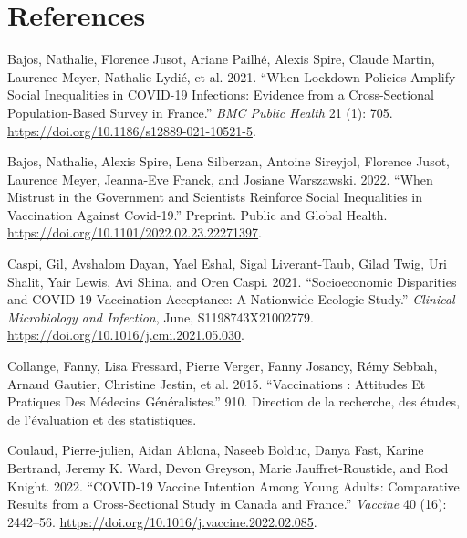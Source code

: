 \documentclass[
]{article}
\newlength{\cslhangindent}
\newlength{\cslentryspacingunit} %
\newenvironment{CSLReferences}[2] %
 {%
  \setlength{\parindent}{0pt}
  \ifodd #1
  \let\oldpar\par
  \def\par{\hangindent=\cslhangindent\oldpar}
  \fi
  \setlength{\parskip}{#2\cslentryspacingunit}
 }%
 {}
\begin{document}
\hypertarget{references}{%
\section*{References}\label{references}}

\hypertarget{refs}{}
\begin{CSLReferences}{1}{0}
\leavevmode{}%
Bajos, Nathalie, Florence Jusot, Ariane Pailhé, Alexis Spire, Claude Martin, Laurence Meyer, Nathalie Lydié, et al. 2021. {``When Lockdown Policies Amplify Social Inequalities in {COVID-19} Infections: Evidence from a Cross-Sectional Population-Based Survey in {France}.''} \emph{BMC Public Health} 21 (1): 705. \url{https://doi.org/10.1186/s12889-021-10521-5}.

\leavevmode{}%
Bajos, Nathalie, Alexis Spire, Lena Silberzan, Antoine Sireyjol, Florence Jusot, Laurence Meyer, Jeanna-Eve Franck, and Josiane Warszawski. 2022. {``When Mistrust in the Government and Scientists Reinforce Social Inequalities in Vaccination Against {Covid-19}.''} Preprint. {Public and Global Health}. \url{https://doi.org/10.1101/2022.02.23.22271397}.

\leavevmode{}%
Caspi, Gil, Avshalom Dayan, Yael Eshal, Sigal Liverant-Taub, Gilad Twig, Uri Shalit, Yair Lewis, Avi Shina, and Oren Caspi. 2021. {``Socioeconomic Disparities and {COVID-19} Vaccination Acceptance: A Nationwide Ecologic Study.''} \emph{Clinical Microbiology and Infection}, June, S1198743X21002779. \url{https://doi.org/10.1016/j.cmi.2021.05.030}.

\leavevmode{}%
Collange, Fanny, Lisa Fressard, Pierre Verger, Fanny Josancy, Rémy Sebbah, Arnaud Gautier, Christine Jestin, et al. 2015. {``Vaccinations : Attitudes Et Pratiques Des Médecins Généralistes.''} 910. {Direction de la recherche, des études, de l'évaluation et des statistiques}.

\leavevmode{}%
Coulaud, Pierre-julien, Aidan Ablona, Naseeb Bolduc, Danya Fast, Karine Bertrand, Jeremy K. Ward, Devon Greyson, Marie Jauffret-Roustide, and Rod Knight. 2022. {``{COVID-19} Vaccine Intention Among Young Adults: {Comparative} Results from a Cross-Sectional Study in {Canada} and {France}.''} \emph{Vaccine} 40 (16): 2442--56. \url{https://doi.org/10.1016/j.vaccine.2022.02.085}.


\end{CSLReferences}
\end{document}

